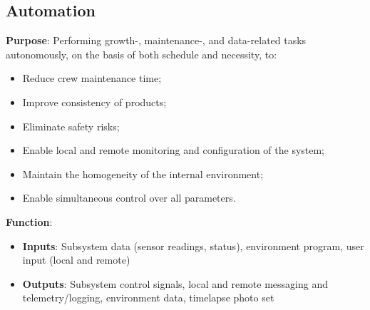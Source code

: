 \subsection{Automation}
\label{sec:automation}

\textbf{Purpose}: Performing growth-, maintenance-, and data-related tasks autonomously, on the basis of both schedule and necessity, to:

\begin{itemize}
    \item Reduce crew maintenance time;
    \item Improve consistency of products;
    \item Eliminate safety risks;
    \item Enable local and remote monitoring and configuration of the system;
    \item Maintain the homogeneity of the internal environment;
    \item Enable simultaneous control over all parameters.
\end{itemize}

\textbf{Function}:
\begin{itemize}
    \item \textbf{Inputs}: Subsystem data (sensor readings, status), environment program, user input (local and remote)
    \item \textbf{Outputs}: Subsystem control signals, local and remote messaging and telemetry/logging, environment data, timelapse photo set
\end{itemize}

